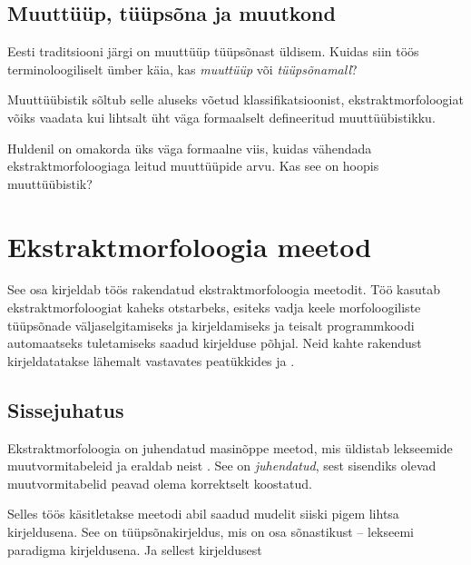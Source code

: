 \documentclass[12pt,a4paper]{article}
\begin{document}
\subsection{Muuttüüp, tüüpsõna ja muutkond}
Eesti traditsiooni järgi on muuttüüp tüüpsõnast üldisem. Kuidas siin töös terminoloogiliselt ümber käia, kas \textit{muuttüüp} või \textit{tüüpsõna\-mall}?

Muuttüübistik sõltub selle aluseks võetud klassifikatsioonist, ekstrakt\-morfoloogiat võiks vaadata kui lihtsalt üht väga formaalselt defineeritud muuttüübistikku.

Huldenil on omakorda üks väga formaalne viis, kuidas vähendada ekstrakt\-morfoloogiaga leitud muuttüüpide arvu. Kas see on hoopis muuttüübistik?




\newpage
\section{Ekstraktmorfoloogia meetod}
\label{sec:ekstraktmorfoloogia-meetod}
See osa kirjeldab töös rakendatud ekstraktmorfoloogia meetodit. Töö kasutab ekstraktmorfoloogiat kaheks otstarbeks, esiteks vadja keele morfoloogiliste tüüpsõnade väljaselgitamiseks ja kirjeldamiseks ja teisalt programmkoodi automaatseks tuletamiseks saadud kirjelduse põhjal. Neid kahte rakendust kirjeldatatakse lähemalt vastavates peatükkides \textit{} ja \textit{}.




\subsection{Sissejuhatus}
\label{sec:ekstraktmorfoloogia-sissejuhatus}

Ekstraktmorfoloogia on juhendatud masinõppe meetod, mis üldistab lekseemide muutvormitabeleid ja eraldab neist . See on \textit{juhendatud}, sest sisendiks olevad muutvormitabelid peavad olema korrektselt koostatud. %

Selles töös käsitletakse meetodi abil saadud mudelit siiski pigem lihtsa kirjeldusena. See on tüüpsõnakirjeldus, mis on osa sõnastikust -- lekseemi paradigma kirjeldusena. Ja sellest kirjeldusest 
\end{document}
